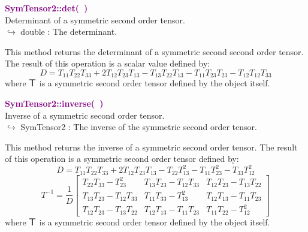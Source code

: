 \textcolor{purple}{\textbf{SymTensor2::det(~)}}\label{SymTensor2::det()}\\
Determinant of a symmetric second order tensor.\\ \hspace*{10mm}$\hookrightarrow$ double : The determinant.

This method returns the determinant of a symmetric second second order tensor.
The result of this operation is a scalar value defined by:
\begin{equation*}
D = T_{11} T_{22} T_{33} + 2 T_{12} T_{23} T_{13} - T_{13} T_{22} T_{13} - T_{11} T_{23} T_{23} - T_{12} T_{12} T_{33}
\end{equation*}
where $\mbox{\large\ensuremath{\mathsf{T}}}$ is a symmetric second order tensor defined by the object itself.

\textcolor{purple}{\textbf{SymTensor2::inverse(~)}}\label{SymTensor2::inverse()}\\
Inverse of a symmetric second order tensor.\\ \hspace*{10mm}$\hookrightarrow$ SymTensor2 : The inverse of the symmetric second order tensor.

This method returns the inverse of a symmetric second order tensor.
The result of this operation is a symmetric second order tensor defined by:
\begin{equation*}
D = T_{11} T_{22} T_{33} + 2 T_{12} T_{23} T_{13} - T_{22} T_{13}^2 - T_{11} T_{23}^2 - T_{33} T_{12}^2
\end{equation*}
\begin{equation*}
T^{-1} = \frac {1}{D} \left[\begin{array}{ccc}
  T_{22}T_{33}-T_{23}^2&T_{13}T_{23}-T_{12}T_{33}&T_{12}T_{23}-T_{13}T_{22}\\
  T_{13}T_{23}-T_{12}T_{33}&T_{11}T_{33}-T_{13}^2&T_{12}T_{13}-T_{11}T_{23}\\
  T_{12}T_{23}-T_{13}T_{22}&T_{12}T_{13}-T_{11}T_{23}&T_{11}T_{22}-T_{12}^2
  \end{array}
  \right]
\end{equation*}
where $\mbox{\large\ensuremath{\mathsf{T}}}$ is a symmetric second order tensor defined by the object itself.

